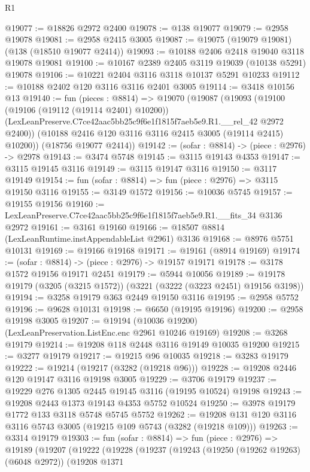 \begin{lexlean}{R1}
\begin{coremodule}
@19077 := @18826 @2972 @2400
@19078 := @138 @19077
@19079 := @2958 @19078
@19081 := @2958 @2415 @3005
@19087 := @19075 (@19079 @19081) (@138 (@18510 @19077 @2414))
@19093 := @10188 @2406 @2418 @19040 @3118 @19078 @19081
@19100 := @10167 @2389 @2405 @3119 @19039 (@10138 @5291) @19078
@19106 := @10221 @2404 @3116 @3118 @10137 @5291 @10233
@19112 := @10188 @2402 @120 @3116 @3116 @2401 @3005
@19114 := @3418 @10156 @13
@19140 := fun (pieces : @8814) =>
  @19070
    (@19087
      (@19093
        (@19100
          (@19106 (@19112 (@19114 @2401) @10200))
          (LexLeanPreserve.C7ce42aac5bb25c9f6e1f1815f7aeb5e9.R1.__rel_42 @2972 @2400))
        (@10188 @2416 @120 @3116 @3116 @2415 @3005 (@19114 @2415) @10200))
      (@18756 @19077 @2414))
@19142 := (sofar : @8814) -> (piece : @2976) -> @2978
@19143 := @3474 @5748
@19145 := @3115 @19143 @4353
@19147 := @3115 @19145 @3116
@19149 := @3115 @19147 @3116
@19150 := @3117 @19149
@19154 := fun (sofar : @8814) => fun (piece : @2976) => @3115 @19150 @3116
@19155 := @3149 @1572
@19156 := @10036 @5745
@19157 := @19155 @19156
@19160 := LexLeanPreserve.C7ce42aac5bb25c9f6e1f1815f7aeb5e9.R1.__fits_34 @3136 @2972
@19161 := @3161 @19160
@19166 := @18507 @8814 (LexLeanRuntime.instAppendableList @2961) @3136
@19168 := @8976 @5751 @10131
@19169 := @19166 @19168
@19171 := @19161 (@8914 @19169)
@19174 := (sofar : @8814) -> (piece : @2976) -> @19157 @19171
@19178 := @3178 @1572 @19156 @19171 @2451
@19179 := @5944 @10056
@19189 := @19178 @19179 (@3205 (@3215 @1572)) (@3221 (@3222 (@3223 @2451) @19156 @3198))
@19194 := @3258 @19179 @363 @2449 @19150 @3116
@19195 := @2958 @5752
@19196 := @9628 @10131
@19198 := @6650 (@19195 @19196)
@19200 := @2958 @19198 @3005
@19207 := @19194 (@10036 @19200) (LexLeanPreservation.ListEnc.enc @2961 @10246 @19169)
@19208 := @3268 @19179
@19214 := @19208 @118 @2448 @3116 @19149 @10035 @19200
@19215 := @3277 @19179
@19217 := @19215 @96 @10035
@19218 := @3283 @19179
@19222 := @19214 (@19217 (@3282 (@19218 @96)))
@19228 := @19208 @2446 @120 @19147 @3116 @19198 @3005
@19229 := @3706 @19179
@19237 := @19229 @276 @1305 @2445 @19145 @3116 (@19195 @10524) @19198
@19243 := @19208 @2443 @1373 @19143 @4353 @5752 @10524
@19250 := @3978 @19179 @1772 @133 @3118 @5748 @5745 @5752
@19262 := @19208 @131 @120 @3116 @3116 @5743 @3005 (@19215 @109 @5743 (@3282 (@19218 @109)))
@19263 := @3314 @19179
@19303 := fun (sofar : @8814) =>
  fun (piece : @2976) =>
  @19189
    (@19207
      (@19222
        (@19228
          (@19237
            (@19243
              (@19250 (@19262 @19263) (@6048 @2972))
              (@19208
                @1371

\end{coremodule}
\end{lexlean}
